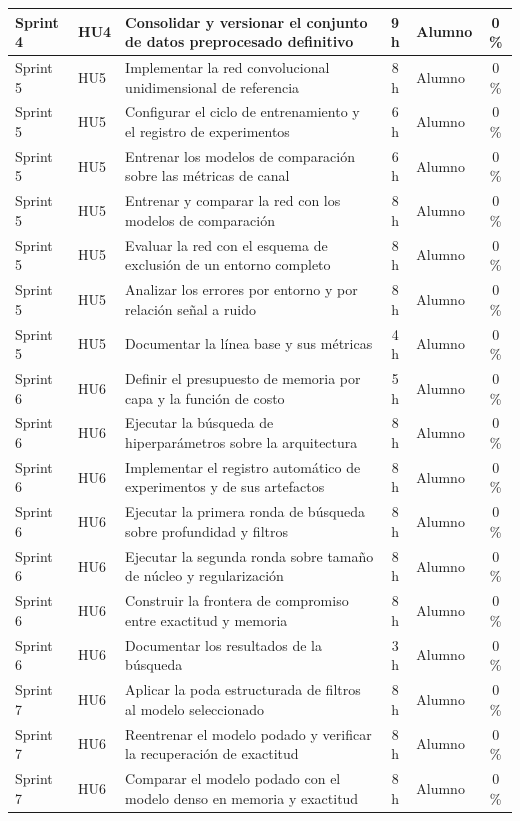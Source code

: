 \documentclass[
11pt, %
]{charter}
\begin{document}
\begin{longtable}{@{}|l|l|p{5.4cm}|c|l|c|@{}}
Sprint 4 & HU4 & Consolidar y versionar el conjunto de datos preprocesado definitivo & 9 h & Alumno & 0 \% \\ \hline
Sprint 5 & HU5 & Implementar la red convolucional unidimensional de referencia & 8 h & Alumno & 0 \% \\ \hline
Sprint 5 & HU5 & Configurar el ciclo de entrenamiento y el registro de experimentos & 6 h & Alumno & 0 \% \\ \hline
Sprint 5 & HU5 & Entrenar los modelos de comparación sobre las métricas de canal & 6 h & Alumno & 0 \% \\ \hline
Sprint 5 & HU5 & Entrenar y comparar la red con los modelos de comparación & 8 h & Alumno & 0 \% \\ \hline
Sprint 5 & HU5 & Evaluar la red con el esquema de exclusión de un entorno completo & 8 h & Alumno & 0 \% \\ \hline
Sprint 5 & HU5 & Analizar los errores por entorno y por relación señal a ruido & 8 h & Alumno & 0 \% \\ \hline
Sprint 5 & HU5 & Documentar la línea base y sus métricas & 4 h & Alumno & 0 \% \\ \hline
Sprint 6 & HU6 & Definir el presupuesto de memoria por capa y la función de costo & 5 h & Alumno & 0 \% \\ \hline
Sprint 6 & HU6 & Ejecutar la búsqueda de hiperparámetros sobre la arquitectura & 8 h & Alumno & 0 \% \\ \hline
Sprint 6 & HU6 & Implementar el registro automático de experimentos y de sus artefactos & 8 h & Alumno & 0 \% \\ \hline
Sprint 6 & HU6 & Ejecutar la primera ronda de búsqueda sobre profundidad y filtros & 8 h & Alumno & 0 \% \\ \hline
Sprint 6 & HU6 & Ejecutar la segunda ronda sobre tamaño de núcleo y regularización & 8 h & Alumno & 0 \% \\ \hline
Sprint 6 & HU6 & Construir la frontera de compromiso entre exactitud y memoria & 8 h & Alumno & 0 \% \\ \hline
Sprint 6 & HU6 & Documentar los resultados de la búsqueda & 3 h & Alumno & 0 \% \\ \hline
Sprint 7 & HU6 & Aplicar la poda estructurada de filtros al modelo seleccionado & 8 h & Alumno & 0 \% \\ \hline
Sprint 7 & HU6 & Reentrenar el modelo podado y verificar la recuperación de exactitud & 8 h & Alumno & 0 \% \\ \hline
Sprint 7 & HU6 & Comparar el modelo podado con el modelo denso en memoria y exactitud & 8 h & Alumno & 0 \% \\ \hline

\end{longtable}
\end{document}
